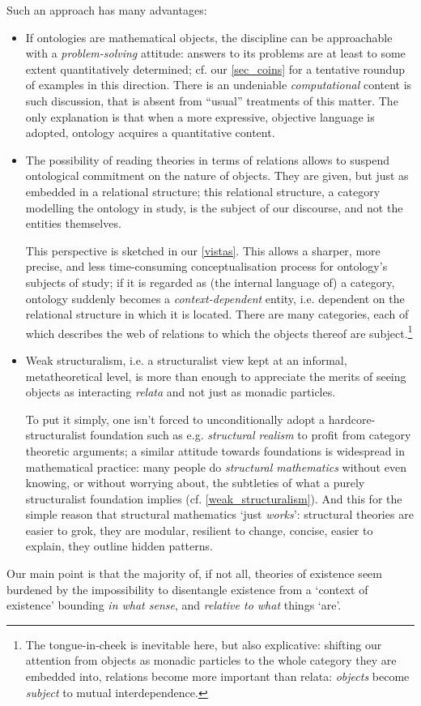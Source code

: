 Such an approach has many advantages:
\begin{itemize}
    \item If ontologies are mathematical objects, the discipline can be approachable with a \emph{problem-solving} attitude: answers to its problems are at least to some extent quantitatively determined; cf. our \autoref{sec_coins} for a tentative roundup of examples in this direction. There is an undeniable \emph{computational} content is such discussion, that is absent from ``usual'' treatments of this matter. The only explanation is that when a more expressive, objective language is adopted, ontology acquires a quantitative content.
    \item The possibility of reading theories in terms of relations allows to suspend ontological commitment on the nature of objects. They are given, but just as embedded in a relational structure; this relational structure, a category modelling the ontology in study, is the subject of our discourse, and not the entities themselves. 
    
    This perspective is sketched in our \autoref{vistas}. This allows a sharper, more precise, and less time-consuming conceptualisation process for ontology's subjects of study; if it is regarded as (the internal language of) a category, ontology suddenly becomes a \emph{context-dependent} entity, i.e. dependent on the relational structure in which it is located. There are many categories, each of which describes the web of relations to which the objects thereof are subject.\footnote{The tongue-in-cheek is inevitable here, but also explicative: shifting our attention from objects as monadic particles to the whole category they are embedded into, relations become more important than relata: \emph{objects} become \emph{subject} to mutual interdependence.}
    \item Weak structuralism, i.e. a structuralist view kept at an informal, metatheoretical level, is more than enough to appreciate the merits of seeing objects as interacting \emph{relata} and not just as monadic particles.
    
    To put it simply, one isn't forced to unconditionally adopt a hardcore-structuralist foundation such as e.g. \emph{structural realism} \cite{bain2013category,eva2016category} to profit from category theoretic arguments; a similar attitude towards foundations is widespread in mathematical practice: many people do \textit{structural mathematics} without even knowing, or without worrying about, the subtleties of what a purely structuralist foundation implies (cf. \autoref{weak_structuralism}). And this for the simple reason that structural mathematics `just \emph{works}': structural theories are easier to grok, they are modular, resilient to change, concise, easier to explain, they outline hidden patterns.
\end{itemize}
Our main point is that the majority of, if not all, theories of existence seem burdened by the impossibility to disentangle existence from a `context of existence' bounding \emph{in what sense}, and \emph{relative to what} things `are'. 

